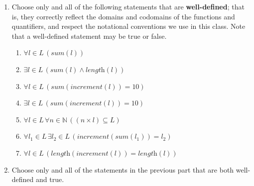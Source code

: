 \documentclass[12pt, oneside]{article}
\begin{document}
\begin{enumerate}
    \newpage
    \item Choose only and all of the following statements that are \textbf{well-defined}; that is, they correctly reflect the domains and codomains of the functions and quantifiers, and respect the notational conventions we use in this class. Note that a well-defined statement may be true or false.

    \begin{multicols}{2}    
    \begin{enumerate}
        \item $\forall l \in L \, (\textit{sum}(l))$
        \item $\exists l \in L \, (\textit{sum}(l) \land \textit{length}(l))$
        \item $\forall l \in L \, (\textit{sum}(\textit{increment}(l)) = 10)$
        \item $\exists l \in L \, (\textit{sum}(\textit{increment}(l)) = 10)$
        \item $\forall l \in L \, \forall n \in \mathbb{N} \, ((n \times l) \subseteq L)$
        \item $\forall l_1 \in L \, \exists l_2 \in L \, (\textit{increment}(\textit{sum}(l_1)) = l_2)$
        \item $\forall l \in L \, (\textit{length}(\textit{increment}(l)) = \textit{length}(l))$
    \end{enumerate}
    \end{multicols}
    
    \item Choose only and all of the statements in the previous part that are both well-defined and true.
\end{enumerate} 
\end{document}

